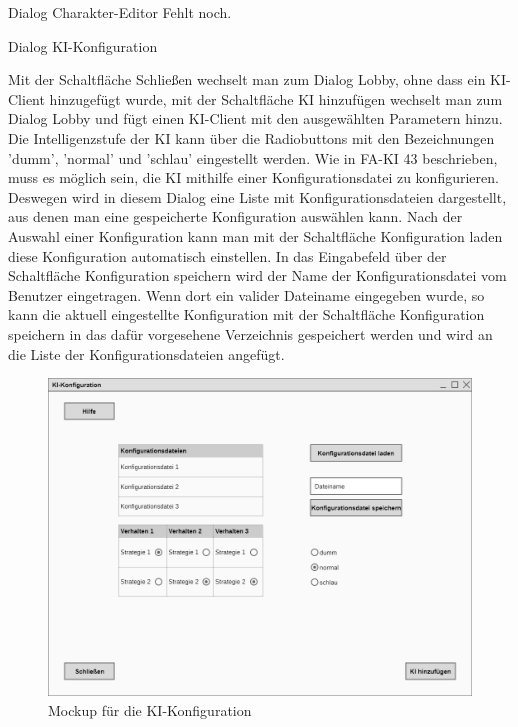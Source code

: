 Dialog \glqq{}Charakter-Editor\grqq{}
Fehlt noch.

Dialog \glqq{}KI-Konfiguration\grqq{}

Mit der Schaltfläche \glqq{}Schließen\grqq{} wechselt man zum Dialog \glqq{}Lobby\grqq{}, ohne dass ein KI-Client hinzugefügt wurde, mit der Schaltfläche \glqq{}KI hinzufügen\grqq{} wechselt man zum Dialog \glqq{}Lobby\grqq{} und fügt einen KI-Client mit den ausgewählten Parametern hinzu.
Die Intelligenzstufe der KI kann über die Radiobuttons mit den Bezeichnungen 'dumm', 'normal' und 'schlau' eingestellt werden.
Wie in FA-KI 43 beschrieben, muss es möglich sein, die KI mithilfe einer Konfigurationsdatei zu konfigurieren. Deswegen wird in diesem Dialog eine Liste mit Konfigurationsdateien dargestellt, aus denen man eine gespeicherte Konfiguration auswählen kann. Nach der Auswahl einer Konfiguration kann man mit der Schaltfläche \glqq{}Konfiguration laden\grqq{} diese Konfiguration automatisch einstellen.
In das Eingabefeld über der Schaltfläche \glqq{}Konfiguration speichern\grqq{} wird der Name der Konfigurationsdatei vom Benutzer eingetragen. Wenn dort ein valider Dateiname eingegeben wurde, so kann die aktuell eingestellte Konfiguration mit der Schaltfläche \glqq{}Konfiguration speichern\grqq{} in das dafür vorgesehene Verzeichnis gespeichert werden und wird an die Liste der Konfigurationsdateien angefügt.

\begin{figure}
  \centering
  \includegraphics[width=\textwidth]{Meilenstein03/KI-Konfiguration_Mockup.png}
  \caption{Mockup für die KI-Konfiguration}
\end{figure}

